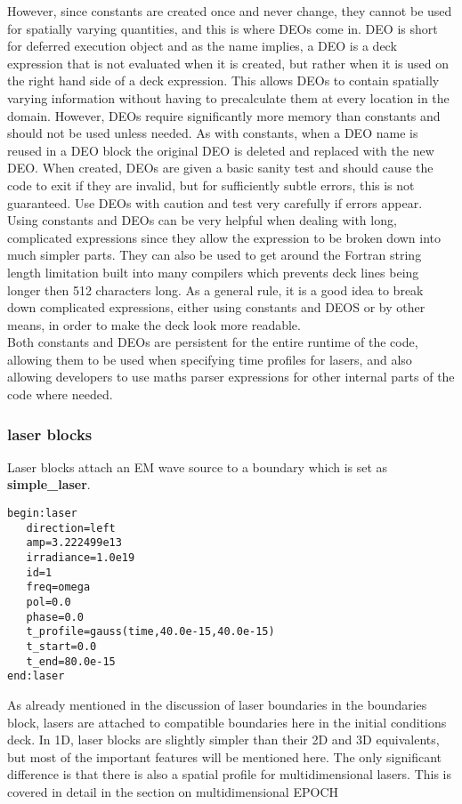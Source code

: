 \documentclass[12pt]{article}
\newcommand{\boxverbatim}[1]{\begin{Verbatim}[obeytabs=true,frame=single,
  framerule=0.5mm,rulecolor=\color{warwickmid},label=#1]}
\newcommand{\inlineemph}[1]{{\color{warwicklight} \bf{#1}}}
\newcommand{\nEPOCH}{{\color{warwickdark}\fontfamily{phv}\selectfont EPOCH}}
\newcommand{\EPOCH}{{\nEPOCH} }
\begin{document}
However, since constants are created once and never change, they cannot be used
for spatially varying quantities, and this is where DEOs come in. DEO is short
for deferred execution object and as the name implies, a DEO is a deck
expression that is not evaluated when it is created, but rather when it is used
on the right hand side of a deck expression. This allows DEOs to contain
spatially varying information without having to precalculate them at every
location in the domain. However, DEOs require significantly more memory than
constants and should not be used unless needed. As with constants, when a DEO
name is reused in a DEO block the original DEO is deleted and replaced with the
new DEO. When created, DEOs are given a basic sanity test and should cause the
code to exit if they are invalid, but for sufficiently subtle errors, this is
not guaranteed. Use DEOs with caution and test very carefully if errors
appear.\\

Using constants and DEOs can be very helpful when dealing with long,
complicated expressions since they allow the expression to be broken down into
much simpler parts. They can also be used to get around the Fortran string
length limitation built into many compilers which prevents deck lines being
longer then 512 characters long. As a general rule, it is a good idea to break
down complicated expressions, either using constants and DEOS or by other
means, in order to make the deck look more readable.\\

Both constants and DEOs are persistent for the entire runtime of the code,
allowing them to be used when specifying time profiles for lasers, and also
allowing developers to use maths parser expressions for other internal parts of
the code where needed.

\subsubsection{\inlineemph{laser} blocks}
Laser blocks attach an EM wave source to a boundary which is set as
\inlineemph{simple\_laser}.

\boxverbatim{laser block}
begin:laser
   direction=left
   amp=3.222499e13
   irradiance=1.0e19
   id=1
   freq=omega
   pol=0.0
   phase=0.0
   t_profile=gauss(time,40.0e-15,40.0e-15)
   t_start=0.0
   t_end=80.0e-15
end:laser
\end{Verbatim}

As already mentioned in the discussion of laser boundaries in the boundaries
block, lasers are attached to compatible boundaries here in the initial
conditions deck. In 1D, laser blocks are slightly simpler than their 2D and 3D
equivalents, but most of the important features will be mentioned here. The
only significant difference is that there is also a spatial profile for
multidimensional lasers. This is covered in detail in the section on
multidimensional \EPOCH\\
\end{document}
